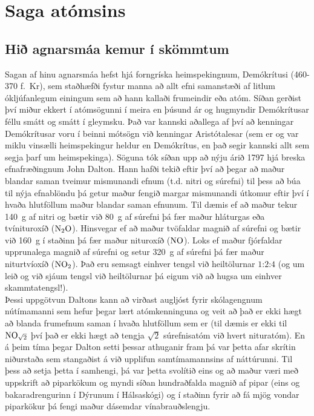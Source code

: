 \ifdefined \wholebook \else\documentclass[oneside]{book}\usepackage{EdlBook}\graphicspath{{figures/}}
\begin{document}
%
\setcounter{chapter}{20} %
%
\fi

\renewcommand{\thefigure}{\arabic{figure}}


\chapter{Saga atómsins}

\section{Hið agnarsmáa kemur í skömmtum}

Sagan af hinu agnarsmáa hefst hjá forngríska heimspekingnum, Demókrítusi (460-370 f.~Kr), sem staðhæfði fystur manna að allt efni samanstæði af litlum ókljúfanlegum einingum sem að hann kallaði frumeindir eða atóm. Síðan gerðist því miður ekkert í atómsögunni í meira en þúsund ár og hugmyndir Demókrítusar féllu smátt og smátt í gleymsku. Það var kannski aðallega af því að kenningar Demókrítusar voru í beinni mótsögn við kenningar Aristótalesar (sem er og var miklu vinsælli heimspekingur heldur en Demókrítus, en það segir kannski allt sem segja þarf um heimspekinga). Söguna tók síðan upp að nýju árið 1797 hjá breska efnafræðingnum John Dalton. Hann hafði tekið eftir því að þegar að maður blandar saman tveimur mismunandi efnum (t.d. nitri og súrefni) til þess að búa til nýja efnablöndu þá getur maður fengið margar mismunandi útkomur eftir því í hvaða hlutföllum maður blandar saman efnunum. Til dæmis ef að maður tekur \SI{140}{g} af nitri og bætir við \SI{80}{g} af súrefni þá fær maður hláturgas eða tvínituroxíð ($\ce{N_2O}$). Hinsvegar ef að maður tvöfaldar magnið af súrefni og bætir við \SI{160}{g} í staðinn þá fær maður nituroxíð ($\ce{NO}$). Loks ef maður fjórfaldar upprunalega magnið af súrefni og setur \SI{320}{g} af súrefni þá fær maður niturtvíoxíð ($\ce{NO_2}$). Það eru semsagt einhver tengsl við heiltölurnar $1$:$2$:$4$ (og um leið og við sjáum tengsl við heiltölurnar þá eigum við að hugsa um einhver skammtatengsl!). \\

Þessi uppgötvun Daltons kann að virðast augljóst fyrir skólagengnum nútímamanni sem hefur þegar lært atómkenninguna og veit að það er ekki hægt að blanda frumefnum saman í hvaða hlutföllum sem er (til dæmis er ekki til $\ce{NO_{\sqrt{2}}}$ því það er ekki hægt að tengja $\sqrt{2}$ súrefnisatóm við hvert nituratóm). En á þeim tíma þegar Dalton setti þessar athuganir fram þá var þetta afar skrítin niðurstaða sem stangaðist á við upplifun samtímamannsins af náttúrunni. Til þess að setja þetta í samhengi, þá var þetta svolítið eins og að maður væri með uppskrift að piparkökum og myndi síðan hundraðfalda magnið af pipar (eins og bakaradrengurinn í Dýrunum í Hálsaskógi) og í staðinn fyrir að fá mjög vondar piparkökur þá fengi maður dásemdar vínabrauðslengju. \\
\end{document}
